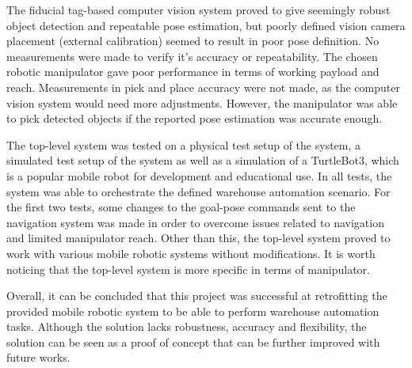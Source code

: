 The fiducial tag-based computer vision system proved to give seemingly robust object detection and repeatable pose estimation, but poorly defined vision camera placement (external calibration) seemed to result in poor pose definition. No measurements were made to verify it's accuracy or repeatability. The chosen robotic manipulator gave poor performance in terms of working payload and reach. Measurements in pick and place accuracy were not made, as the computer vision system would need more adjustments. However, the manipulator was able to pick detected objects if the reported pose estimation was accurate enough.

The top-level system was tested on a physical test setup of the system, a simulated test setup of the system as well as a simulation of a TurtleBot3, which is a popular mobile robot for development and educational use. In all tests, the system was able to orchestrate the defined warehouse automation scenario. For the first two tests, some changes to the goal-pose commands sent to the navigation system was made in order to overcome issues related to navigation and limited manipulator reach. Other than this, the top-level system proved to work with various mobile robotic systems without modifications. It is worth noticing that the top-level system is more specific in terms of manipulator.

Overall, it can be concluded that this project was successful at retrofitting the provided mobile robotic system to be able to perform warehouse automation tasks. Although the solution lacks robustness, accuracy and flexibility, the solution can be seen as a proof of concept that can be further improved with future works.

